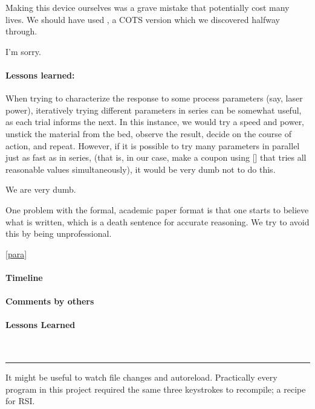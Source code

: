 \documentclass[paper.tex]{subfiles}
\begin{document}
Making this device ourselves was a grave mistake that potentially cost many lives. We should have used \cite{Straight}, a COTS version which we discovered halfway through. 

I'm sorry.

\paragraph{Lessons learned:}

When trying to characterize the response to some process parameters (say, laser power), iteratively trying different parameters in series can be somewhat useful, as each trial informs the next. In this instance, we would try a speed and power, unstick the material from the bed, observe the result, decide on the course of action, and repeat. However, if it is possible to try many parameters in parallel just as fast as in series, (that is, in our case, make a coupon using [] that tries all reasonable values simultaneously), it would be very dumb not to do this.

We are very dumb.

\printbibliography[title={General fluidics resources}, keyword={microfluidics}]

\printbibliography[title={Centrifugal}, keyword={centrifugal}]



One problem with the formal, academic paper format is that one starts to believe what is written, which is a death sentence for accurate reasoning. We try to avoid this by being unprofessional.

\label{para}
\ref{para}

\paragraph{Timeline}

\paragraph{Comments by others}

\paragraph{Lessons Learned} \


\rule{\linewidth}{0.2pt}

It might be useful to watch file changes and autoreload. Practically every program in this project required the same three keystrokes to recompile; a recipe for RSI.
\end{document}
